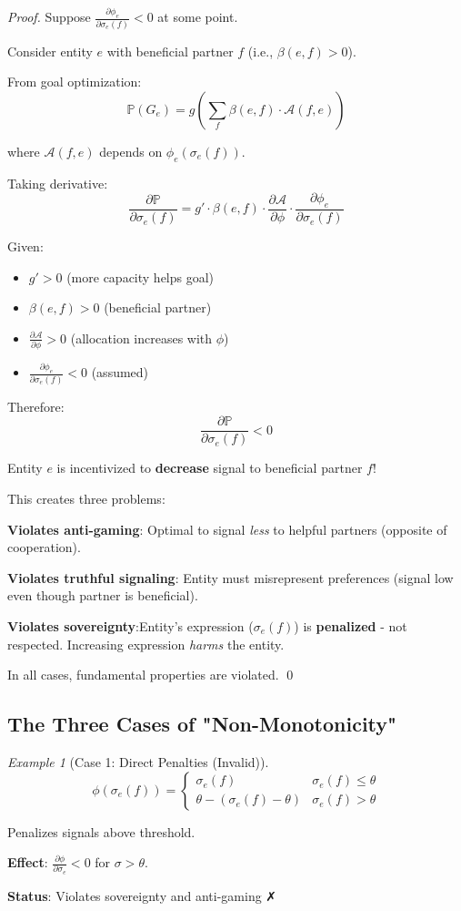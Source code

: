 \documentclass[11pt,a4paper]{article}
\theoremstyle{definition}
\theoremstyle{remark}
\newtheorem{example}[theorem]{Example}
\newcommand{\A}{\mathcal{A}}
\begin{document}
\begin{proof}
Suppose $\frac{\partial \phi_e}{\partial \sigma_e(f)} < 0$ at some point.

Consider entity $e$ with beneficial partner $f$ (i.e., $\beta(e,f) > 0$).

From goal optimization:
\[ \mathbb{P}(G_e) = g\left(\sum_f \beta(e,f) \cdot \A(f,e)\right) \]

where $\A(f,e)$ depends on $\phi_e(\sigma_e(f))$.

Taking derivative:
\[ \frac{\partial \mathbb{P}}{\partial \sigma_e(f)} = g' \cdot \beta(e,f) \cdot \frac{\partial \A}{\partial \phi} \cdot \frac{\partial \phi_e}{\partial \sigma_e(f)} \]

Given:
\begin{itemize}
\item $g' > 0$ (more capacity helps goal)
\item $\beta(e,f) > 0$ (beneficial partner)
\item $\frac{\partial \A}{\partial \phi} > 0$ (allocation increases with $\phi$)
\item $\frac{\partial \phi_e}{\partial \sigma_e(f)} < 0$ (assumed)
\end{itemize}

Therefore:
\[ \frac{\partial \mathbb{P}}{\partial \sigma_e(f)} < 0 \]

Entity $e$ is incentivized to \textbf{decrease} signal to beneficial partner $f$!

This creates three problems:

\textbf{Violates anti-gaming}: Optimal to signal \textit{less} to helpful partners (opposite of cooperation).

\textbf{Violates truthful signaling}: Entity must misrepresent preferences (signal low even though partner is beneficial).

\textbf{Violates sovereignty}:Entity's expression ($\sigma_e(f)$) is \textbf{penalized} - not respected. Increasing expression \textit{harms} the entity.

In all cases, fundamental properties are violated. \qed
\end{proof}

\subsection{The Three Cases of "Non-Monotonicity"}

\begin{example}[Case 1: Direct Penalties (Invalid)]
\[ \phi(\sigma_e(f)) = \begin{cases}
\sigma_e(f) & \sigma_e(f) \le \theta \\
\theta - (\sigma_e(f) - \theta) & \sigma_e(f) > \theta
\end{cases} \]

Penalizes signals above threshold.

\textbf{Effect}: $\frac{\partial \phi}{\partial \sigma_e} < 0$ for $\sigma > \theta$.

\textbf{Status}: Violates sovereignty and anti-gaming ✗
\end{example}
\end{document}
